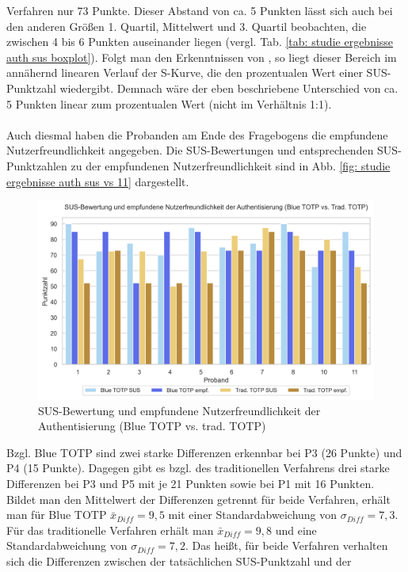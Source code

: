 Verfahren nur 73 Punkte. Dieser Abstand von ca. 5 Punkten lässt sich auch bei den 
anderen Größen 1. Quartil, Mittelwert und 3. Quartil beobachten, die zwischen 4 bis 6 
Punkten auseinander liegen (vergl. Tab. \ref{tab: studie ergebnisse auth sus 
boxplot}). Folgt man den Erkenntnissen von \textcite{Sauro}, so liegt dieser Bereich 
im annähernd linearen Verlauf der S-Kurve, die den prozentualen Wert einer 
SUS-Punktzahl wiedergibt. Demnach wäre der eben beschriebene  Unterschied von ca. 5 
Punkten linear zum prozentualen Wert (nicht im Verhältnis 1:1).
\\\\
Auch diesmal haben die Probanden am Ende des Fragebogens die empfundene 
Nutzerfreundlichkeit angegeben. Die SUS-Bewertungen und entsprechenden 
SUS-Punktzahlen zu der empfundenen Nutzerfreundlichkeit sind in Abb. \ref{fig: studie 
ergebnisse auth sus vs 11} dargestellt.
\begin{figure}
    \centering
    \includegraphics[width=0.8\linewidth]{data_processing/questionaires/results/usage_sus_vs_sus11.png}
    \caption[SUS-Bewertung und empfundene Nutzerfreundlichkeit (Authentisierung)]{SUS-Bewertung und empfundene Nutzerfreundlichkeit der Authentisierung (Blue TOTP vs. trad. TOTP)}
    \label{fig: studie ergebnisse auth sus vs 11}
\end{figure}
Bzgl. Blue TOTP sind zwei starke Differenzen erkennbar bei P3 (26 Punkte) und P4 (15 
Punkte). Dagegen gibt es bzgl. des traditionellen Verfahrens drei starke Differenzen 
bei P3 und P5 mit je 21 Punkten sowie bei P1 mit 16 Punkten. Bildet man den 
Mittelwert der Differenzen getrennt für beide Verfahren, erhält man für Blue TOTP 
$\bar{x}_{Diff} = 9{,}5$ mit einer Standardabweichung von $\sigma_{Diff} = 7,3$. Für 
das traditionelle Verfahren erhält man $\bar{x}_{Diff} = 9{,}8$ und eine 
Standardabweichung von $\sigma_{Diff} = 7{,}2$. Das heißt, für beide Verfahren 
verhalten sich die Differenzen zwischen der tatsächlichen SUS-Punktzahl und der 

